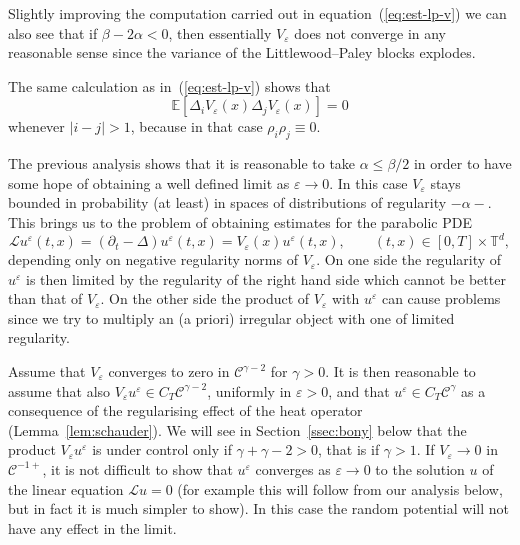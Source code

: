 \documentclass[a4paper,11pt]{article}
\newcommand{\LL}{\mathscr{L}}
\newcommand{\CC}{\mathscr{C}}
\begin{document}
Slightly improving the computation carried out in equation~(\ref{eq:est-lp-v}) we can also see that if $\beta - 2 \alpha < 0$, then essentially $V_{\varepsilon}$ does not converge in any reasonable sense since the variance of the Littlewood--Paley blocks explodes.

\begin{remark}
  \label{rmk:different V blocks orthogonal}The same calculation as
  in~(\ref{eq:est-lp-v}) shows that
  \[ \mathbb{E} [\Delta_i V_{\varepsilon} (x) \Delta_j V_{\varepsilon} (x)] =
     0 \]
  whenever $| i - j | > 1$, because in that case $\rho_i \rho_j \equiv 0$.
\end{remark}

The previous analysis shows that it is reasonable to take $\alpha \leqslant
\beta / 2$ in order to have some hope of obtaining a well defined limit as
$\varepsilon \rightarrow 0$. In this case $V_{\varepsilon}$ stays bounded in probability (at
least) in spaces of distributions of regularity $-\alpha -$. This brings us to
the problem of obtaining estimates for the parabolic PDE
\[ \LL u^{\varepsilon} (t, x) = (\partial_t - \Delta) u^{\varepsilon} (t, x) =
   V_{\varepsilon} (x) u^{\varepsilon} (t, x), \hspace{2em} (t, x) \in [0, T]
   \times \mathbb{T}^d, \]
depending only on negative regularity norms of $V_{\varepsilon}$. On one side
the regularity of $u^{\varepsilon}$ is then limited by the regularity of the
right hand side which cannot be better than that of $V_{\varepsilon}$. On the
other side the product of $V_{\varepsilon}$ with $u^{\varepsilon}$ can cause
problems since we try to multiply an (a priori) irregular object with one of
limited regularity.

Assume that $V_{\varepsilon}$ converges to zero in $\CC^{\gamma - 2}$ for $\gamma > 0$. It is then reasonable to assume that also $V_{\varepsilon} u^{\varepsilon} \in C_T
\CC^{\gamma - 2}$, uniformly in $\varepsilon > 0$, and that $u^{\varepsilon} \in C_T \CC^{\gamma}$ as a
consequence of the regularising effect of the heat operator
(Lemma~\ref{lem:schauder}). We will see in Section~\ref{ssec:bony} below that
the product $V_{\varepsilon} u^{\varepsilon}$ is under control only if $\gamma
+ \gamma - 2 > 0$, that is if $\gamma > 1$. If $V_{\varepsilon} \rightarrow
0$ in $\CC^{- 1 +}$, it is not difficult to show that $u^{\varepsilon}$
converges as $\varepsilon \rightarrow 0$ to the solution $u$ of the linear
equation $\LL u = 0$ (for example this will follow from our analysis below, but in fact it is much simpler to show). In this case the random potential will not have any
effect in the limit.
\end{document}
